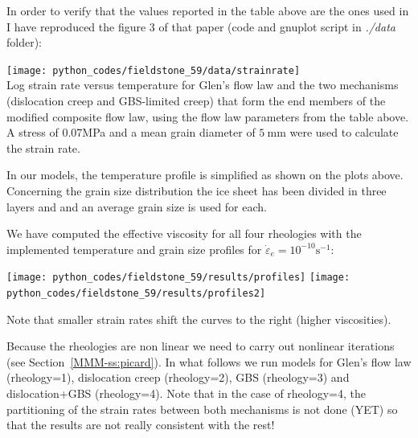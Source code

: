 In order to verify that the values reported in the table above are the ones 
used in \cite{kudd19} I have reproduced the figure 3 of that paper (code and gnuplot
script in {\sl ./data} folder):
\begin{center}
\texttt{[image: python\_codes/fieldstone\_59/data/strainrate]}\\
{\captionfont Log strain rate versus temperature for Glen's flow law and 
the two mechanisms (dislocation creep and GBS-limited creep) that form the end members 
of the modified composite flow law, using the flow law parameters from the table above. 
A stress of 0.07MPa and a mean grain diameter of $5~\si{\milli\meter}$ 
were used to calculate the strain rate.}
\end{center}


In our models, the temperature profile is simplified 
as shown on the plots above. 
Concerning the grain size distribution the ice sheet has been divided in three 
layers and and an average grain size is used for each.

We have computed the effective viscosity for all four rheologies with the 
implemented temperature and grain size profiles for $\dot{\varepsilon}_e=10^{-10}\text{s}^{-1}$:

\begin{center}
\texttt{[image: python\_codes/fieldstone\_59/results/profiles]}
\texttt{[image: python\_codes/fieldstone\_59/results/profiles2]}
\end{center}
Note that smaller strain rates shift the curves to the right (higher viscosities).



Because the rheologies are non linear we need to carry out nonlinear iterations 
(see Section~\ref{MMM-ss:picard}).
In what follows we run models for Glen's flow law (rheology=1), 
dislocation creep (rheology=2), GBS (rheology=3) and dislocation+GBS (rheology=4).
Note that in the case of rheology=4, the partitioning of the strain rates between both 
mechanisms is not done (YET) so that the results are not really consistent with the rest!

